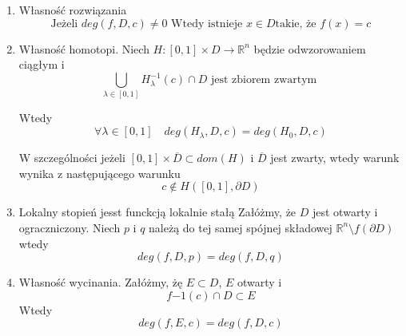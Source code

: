 \begin{enumerate}
 \item Własność rozwiązania \newline
   \begin{equation}
   \mbox{Jeżeli  }  deg(f,D,c) \neq 0  \mbox{ Wtedy istnieje } x \in D  \mbox{takie, że }  f(x) = c 
   \end{equation}
   
  \item Własność homotopi.  \newline
  Niech $ H : [0,1] \times D \to \mathbb R^n $ będzie odwzorowaniem ciągłym i 
  \begin{equation} \label{eq:homotopy}
    \bigcup_{\lambda \in [0,1] } H^{-1}_{\lambda }(c) \cap D \mbox{ jest zbiorem zwartym }
  \end{equation}

  Wtedy 
  \begin{equation}
      \forall \lambda \in [0,1] \quad deg(H_{\lambda},D,c) = deg(H_0,D,c) 
  \end{equation}
  
  W szczególności jeżeli $ [0,1] \times \overline{D} \subset dom(H) $ i $ \overline{D} $ jest zwarty, wtedy warunk wynika z następującego warunku
  \begin{equation}
    c \notin H([0,1], \partial{D})
  \end{equation}
  
  \item Lokalny stopień jesst funckcją lokalnie stałą \newline
    Załóżmy, że $ D $ jest otwarty i ograczniczony. Niech $p $ i $ q $ należą do tej samej spójnej składowej $ \mathbb R^n  \setminus f(\partial{D}) $  wtedy
    \begin{equation} \label{eq:locallity}
      deg(f,D,p) = deg(f,D,q)
    \end{equation}
  
  \item Własność wycinania. \newline
    Załóżmy, żę $ E \subset D $, $ E $ otwarty i 
    \begin{equation}
	f{-1}(c) \cap D \subset E 
    \end{equation}
    Wtedy
    \begin{equation}
        deg(f,E,c) = deg(f,D,c)
    \end{equation}
    

\end{enumerate}
